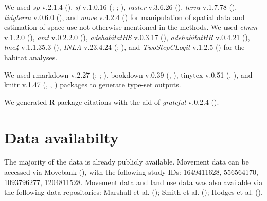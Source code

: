 \documentclass[10pt,a4paper]{article}
\begin{document}
We used \emph{sp} v.2.1.4 (), \emph{sf} v.1.0.16 (; ; ), \emph{raster} v.3.6.26 (), \emph{terra} v.1.7.78 (), \emph{tidyterra} v.0.6.0 (), and \emph{move} v.4.2.4 () for manipulation of spatial data and estimation of space use not otherwise mentioned in the methods.
We used \emph{ctmm} v.1.2.0 (), \emph{amt} v.0.2.2.0 (), \emph{adehabitatHS} v.0.3.17 (), \emph{adehabitatHR} v.0.4.21 (), \emph{lme4} v.1.1.35.3 (), \emph{INLA} v.23.4.24 (; ), and \emph{TwoStepCLogit} v.1.2.5 () for the habitat analyses.

We used rmarkdown v.2.27 (; ; ), bookdown v.0.39 (, ), tinytex v.0.51 (, ), and knitr v.1.47 (, , ) packages to generate type-set outputs.

We generated R package citations with the aid of \emph{grateful} v.0.2.4 ().

\section{Data availabilty}\label{data-availabilty}

The majority of the data is already publicly available.
Movement data can be accessed via Movebank (), with the following study IDs: 1649411628, 556564170, 1093796277, 1204811528.
Movement data and land use data was also available via the following data repositories: Marshall et al. (); Smith et al. (); Hodges et al. ().
\end{document}
